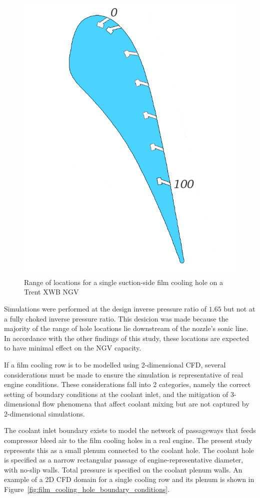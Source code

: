 \documentclass[a4paper, 11pt, oneside]{report}
\begin{document}
\begin{figure}[H]
	\centering
	\includegraphics[width=.45\textwidth]{figs/SCH_hole_range.png}
	\caption{Range of locations for a single suction-side film cooling hole on a Trent XWB NGV}
    \label{fig:SCH_hole_range}
\end{figure}

Simulations were performed at the design inverse pressure ratio of $1.65$ but not at a fully choked inverse pressure ratio. This desicion was made because the majority of the range of hole locations lie downstream of the nozzle's sonic line. In accordance with the other findings of this study, these locations are expected to have minimal effect on the NGV capacity.

If a film cooling row is to be modelled using 2-dimensional CFD, several considerations must be made to ensure the simulation is representative of real engine conditions. These considerations fall into 2 categories, namely the correct setting of boundary conditions at the coolant inlet, and the mitigation of 3-dimensional flow phenomena that affect coolant mixing but are not captured by 2-dimensional simulations. %

The coolant inlet boundary exists to model the network of passageways that feeds compressor bleed air to the film cooling holes in a real engine. The present study represents this as a small plenum connected to the coolant hole. The coolant hole is specified as a narrow rectangular passage of engine-representative diameter, with no-slip walls. Total pressure is specified on the coolant plenum walls. An example of a 2D CFD domain for a single cooling row and its plenum is shown in Figure~\ref{fig:film_cooling_hole_boundary_conditions}.
\end{document}
